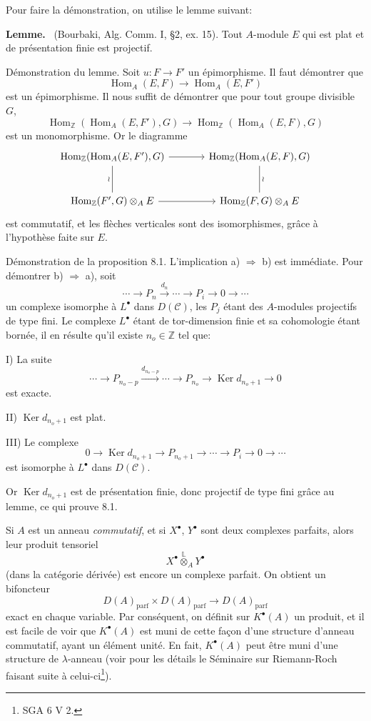 \documentclass[11pt]{article}
\newenvironment{statement}[1]{\par\medskip\noindent\textbf{#1.}\ }{\par\medskip}
\DeclareMathOperator{\Hom}{Hom}
\providecommand{\Ker}{\operatorname{Ker}}
\providecommand{\parf}{\mathrm{parf}}
\providecommand{\Hom}{\operatorname{Hom}}
\providecommand{\cC}{\mathcal C}
\providecommand{\Ker}{\operatorname{Ker}}
\providecommand{\Ker}{\operatorname{Ker}}
\providecommand{\cC}{\mathcal C}
\providecommand{\parf}{\mathrm{parf}}
\providecommand{\Hom}{\operatorname{Hom}}
\begin{document}
Pour faire la démonstration, on utilise le lemme suivant:

\begin{statement}{Lemme}
(Bourbaki, Alg. Comm. I, §2, ex. 15). Tout $A$-module $E$ qui est plat et de présentation finie est projectif.
\end{statement}

Démonstration du lemme. Soit $u:F\to F'$ un épimorphisme. Il faut démontrer que
\[
\Hom_A(E,F)\longrightarrow\Hom_A(E,F')
\]
est un épimorphisme. Il nous suffit de démontrer que pour tout groupe divisible $G$,
\[
\Hom_{\mathbb Z}(\Hom_A(E,F'),G)\longrightarrow
\Hom_{\mathbb Z}(\Hom_A(E,F),G)
\]
est un monomorphisme. Or le diagramme
\[
\begin{tikzcd}[column sep=large,row sep=large]
\Hom_{\mathbb Z}(\Hom_A(E,F'),G)
 \arrow[r]\arrow[d,dash,"\wr"']&
\Hom_{\mathbb Z}(\Hom_A(E,F),G)\arrow[d,dash,"\wr"]\\
\Hom_{\mathbb Z}(F',G)\otimes_A E
 \arrow[r]&
\Hom_{\mathbb Z}(F,G)\otimes_A E
\end{tikzcd}
\]
est commutatif, et les flèches verticales sont des isomorphismes, grâce à l'hypothèse faite sur $E$.

Démonstration de la proposition 8.1. L'implication a) $\Rightarrow$ b) est immédiate. Pour démontrer b) $\Rightarrow$ a), soit
\[
\cdots\longrightarrow P_n\xrightarrow{d_n}\cdots\longrightarrow P_i\longrightarrow 0\longrightarrow\cdots
\]
un complexe isomorphe à $L^\bullet$ dans $D(\cC)$, les $P_j$ étant des $A$-modules projectifs de type fini. Le complexe $L^\bullet$ étant de tor-dimension finie et sa cohomologie étant bornée, il en résulte qu'il existe $n_o\in\mathbb Z$ tel que:

I) La suite
\[
\cdots\longrightarrow P_{n_o-p}\xrightarrow{d_{n_o-p}}\cdots\longrightarrow
P_{n_o}\longrightarrow \Ker d_{n_o+1}\longrightarrow0
\]
est exacte.

II) $\Ker d_{n_o+1}$ est
plat.

III) Le complexe
\[
0\longrightarrow \Ker d_{n_o+1}\longrightarrow P_{n_o+1}\longrightarrow\cdots\longrightarrow P_i\longrightarrow0\longrightarrow\cdots
\]
est isomorphe à $L^\bullet$ dans $D(\cC)$.

Or $\Ker d_{n_o+1}$ est de présentation finie, donc projectif de type fini grâce au lemme, ce qui prouve 8.1.

Si $A$ est un anneau \emph{commutatif}, et si $X^\bullet$, $Y^\bullet$ sont deux complexes parfaits, alors leur produit tensoriel
\[
X^\bullet\overset{\mathbb L}{\otimes}_A Y^\bullet
\]
(dans la catégorie dérivée) est encore un complexe parfait. On obtient un bifoncteur
\[
D(A)_{\parf}\times D(A)_{\parf}\longrightarrow D(A)_{\parf}
\]
exact en chaque variable. Par conséquent, on définit sur $K^{\bullet}(A)$ un produit, et il est facile de voir que $K^{\bullet}(A)$ est muni de cette façon d'une structure d'anneau commutatif, ayant un élément unité. En fait, $K^{\bullet}(A)$ peut être muni d'une structure de $\lambda$-anneau (voir pour les détails le Séminaire sur Riemann-Roch faisant suite à celui-ci\footnote{SGA 6 V 2.}).
\end{document}
